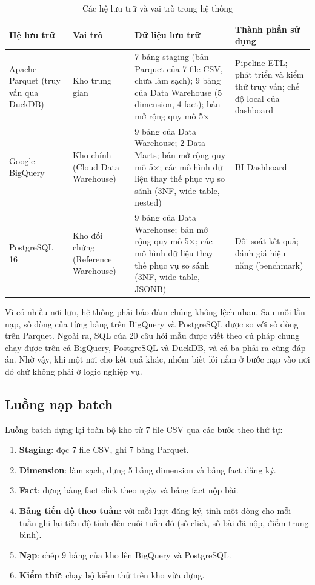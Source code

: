 \begin{table}[htbp]
\centering
\small
\begin{tabularx}{\textwidth}{|p{2.6cm}|p{2.9cm}|X|p{3.1cm}|}
\hline
\textbf{Hệ lưu trữ} & \textbf{Vai trò} & \textbf{Dữ liệu lưu trữ} & \textbf{Thành phần sử dụng} \\ \hline
Apache Parquet (truy vấn qua DuckDB) & Kho trung gian & 7 bảng staging (bản Parquet của 7 file CSV, chưa làm sạch); 9 bảng của Data Warehouse (5 dimension, 4 fact); bản mở rộng quy mô 5$\times$ & Pipeline ETL; phát triển và kiểm thử truy vấn; chế độ local của dashboard \\ \hline
Google BigQuery & Kho chính (Cloud Data Warehouse) & 9 bảng của Data Warehouse; 2 Data Marts; bản mở rộng quy mô 5$\times$; các mô hình dữ liệu thay thế phục vụ so sánh (3NF, wide table, nested) & BI Dashboard \\ \hline
PostgreSQL 16 & Kho đối chứng (Reference Warehouse) & 9 bảng của Data Warehouse; bản mở rộng quy mô 5$\times$; các mô hình dữ liệu thay thế phục vụ so sánh (3NF, wide table, JSONB) & Đối soát kết quả; đánh giá hiệu năng (benchmark) \\ \hline
\end{tabularx}
\caption{Các hệ lưu trữ và vai trò trong hệ thống}
\label{tab:noi-luu}
\end{table}

Vì có nhiều nơi lưu, hệ thống phải bảo đảm chúng không lệch nhau. Sau mỗi lần nạp, số dòng
của từng bảng trên BigQuery và PostgreSQL được so với số dòng trên Parquet. Ngoài ra, SQL
của 20 câu hỏi mẫu được viết theo cú pháp chung chạy được trên cả BigQuery, PostgreSQL và
DuckDB, và cả ba phải ra cùng đáp án. Nhờ vậy, khi một nơi cho kết quả khác, nhóm biết lỗi
nằm ở bước nạp vào nơi đó chứ không phải ở logic nghiệp vụ.

\subsection{Luồng nạp batch}
\label{sec:luong-batch}

Luồng batch dựng lại toàn bộ kho từ 7 file CSV qua các bước theo thứ tự:
\begin{enumerate}
  \item \textbf{Staging}: đọc 7 file CSV, ghi 7 bảng Parquet.
  \item \textbf{Dimension}: làm sạch, dựng 5 bảng dimension và bảng fact đăng ký.
  \item \textbf{Fact}: dựng bảng fact click theo ngày và bảng fact nộp bài.
  \item \textbf{Bảng tiến độ theo tuần}: với mỗi lượt đăng ký, tính một dòng cho mỗi tuần ghi lại tiến độ tính đến cuối tuần đó (số click, số bài đã nộp, điểm trung bình).
  \item \textbf{Nạp}: chép 9 bảng của kho lên BigQuery và PostgreSQL.
  \item \textbf{Kiểm thử}: chạy bộ kiểm thử trên kho vừa dựng.
\end{enumerate}

